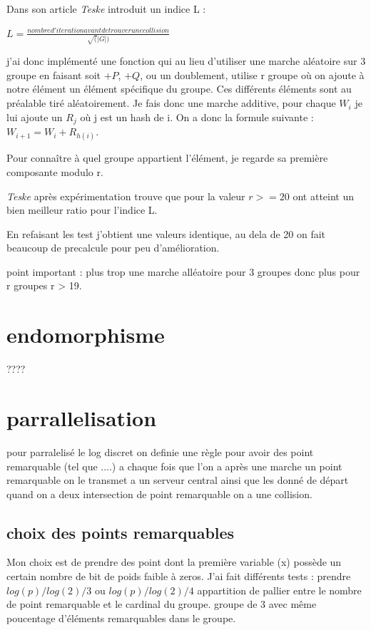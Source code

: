 \documentclass[a4paper,10pt]{report}
\begin{document}
Dans son article \textit{Teske} introduit un indice L :
\begin{center}
 $ L = \frac{nombre d'iteration avant de trouver une collision}{\sqrt(|G|)} $
\end{center}

j'ai donc implémenté une fonction qui au lieu d'utiliser une marche aléatoire sur 3 groupe en faisant soit $+P$, $+Q$, ou un doublement,
utilise r groupe où on ajoute à notre élément un élément spécifique du groupe. Ces différents éléments sont au préalable tiré aléatoirement.
Je fais donc une marche additive, pour chaque $W_i$ je lui ajoute un $R_j$ où j est un hash de i. On a donc la formule suivante : 
$ W_{i+1} = W_{i} + R_{h(i)} $.

Pour connaître à quel groupe appartient l'élément, je regarde sa première composante modulo r.

\textit{Teske} après expérimentation trouve que pour la valeur $r >= 20$ ont atteint un bien meilleur ratio pour l'indice L.

En refaisant les test j'obtient une valeurs identique, au dela de 20 on fait beaucoup de precalcule pour peu d'amélioration.


point important : plus trop une marche alléatoire pour 3 groupes donc plus pour r groupes r > 19.

\chapter{endomorphisme}
 
 ????

\chapter{parrallelisation}

pour parralelisé le log discret on definie une règle pour avoir des point remarquable (tel que ....) 
a chaque fois que l'on a après une marche un point remarquable on le transmet a un serveur central ainsi que les donné de départ
quand on  a deux intersection de point remarquable on a une collision.

\section{choix des points remarquables}

Mon choix est de prendre des point dont la première variable (x) possède un certain nombre de bit de poids faible à zeros.
J'ai fait différents tests : prendre $log(p)/log(2)/3$ ou $log(p)/log(2)/4$ appartition de pallier entre le nombre de point remarquable et le cardinal du groupe.
groupe de 3 avec même poucentage d'éléments remarquables dans le groupe.
\end{document}
